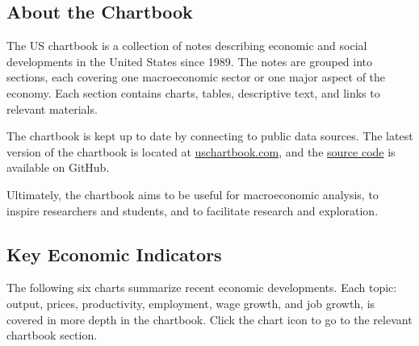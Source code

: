 \documentclass{report}
\begin{document}
\begin{minipage}{1.0\textwidth}
\subsection*{About the Chartbook}

The US chartbook is a collection of notes describing economic and social developments in the United States since 1989. The notes are grouped into sections, each covering one macroeconomic sector or one major aspect of the economy. Each section contains charts, tables, descriptive text, and links to relevant materials. 

The chartbook is kept up to date by connecting to public data sources. The latest version of the chartbook is located at \href{https://www.bd-econ.com/chartbook.html}{uschartbook.com}, and the \href{https://github.com/bdecon/US-chartbook}{source code} is available on GitHub. 

Ultimately, the chartbook aims to be useful for macroeconomic analysis, to inspire researchers and students, and to facilitate research and exploration.
\end{minipage}
\newpage
\thispagestyle{sectpage}
\subsection*{Key Economic Indicators}

\begin{minipage}{1.0\textwidth}
\small The following six charts summarize recent economic developments. Each topic: output, prices, productivity, employment, wage growth, and job growth, is covered in more depth in the chartbook. Click the chart icon \normalsize {\color{blue}\faChartBar[regular]} \small to go to the relevant chartbook section.
\end{minipage}
\vspace{1mm}
\end{document}
